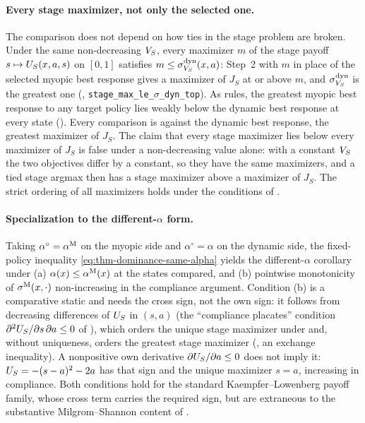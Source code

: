 \paragraph{Every stage maximizer, not only the selected one.}
The comparison does not depend on how ties in the stage problem are broken.
Under the same non-decreasing $V_S$, every maximizer $m$ of the stage payoff
$s\mapsto U_S(x,a,s)$ on $[0,1]$ satisfies $m\le\sigma^{\mathrm{dyn}}_{V_S}(x,a)$: Step~2
with $m$ in place of the selected myopic best response gives a maximizer of
$J_S$ at or above $m$, and $\sigma^{\mathrm{dyn}}_{V_S}$ is the greatest one
(,
\texttt{stage\_max\_le\_$\sigma$\_dyn\_top}). As rules, the greatest myopic
best response to any target policy lies weakly below the dynamic best
response at every state
(). Every comparison is against
the dynamic best response, the greatest maximizer of $J_S$. The claim that every stage maximizer
lies below every maximizer of $J_S$ is false under a non-decreasing
value alone: with a constant $V_S$ the two objectives differ by a constant,
so they have the same maximizers, and a tied stage argmax then has a stage
maximizer above a maximizer of $J_S$. The strict
ordering of all maximizers holds under the conditions of
.

\paragraph{Specialization to the different-$\alpha$ form.}
Taking $\alpha^{\circ}=\alpha^{\mathrm{M}}$ on the myopic side and
$\alpha^{\circ}=\alpha$ on the dynamic side, the fixed-policy
inequality \eqref{eq:thm-dominance-same-alpha} yields the
different-$\alpha$ corollary under (a) $\alpha(x)\le\alpha^{\mathrm{M}}(x)$ at the
states compared, and (b) pointwise monotonicity of $\sigma^{\mathrm{M}}(x,\cdot)$
non-increasing in the compliance argument. Condition (b) is a
comparative static and needs the cross sign, not the own sign: it
follows from decreasing differences of $U_S$ in $(s,a)$ (the
``compliance placates'' condition $\partial^2U_S/\partial s\,\partial a\le0$
of ), which orders the unique stage maximizer under
 and, without uniqueness, orders the greatest stage
maximizer (, an exchange inequality).
A nonpositive own derivative $\partial U_S/\partial a\le0$ does not imply
it: $U_S=-(s-a)^2-2a$ has that sign and the unique maximizer $s=a$,
increasing in compliance. Both conditions hold for the standard
Kaempfer--Lowenberg payoff family, whose cross term carries the required
sign, but are extraneous to the substantive Milgrom--Shannon content of
.

